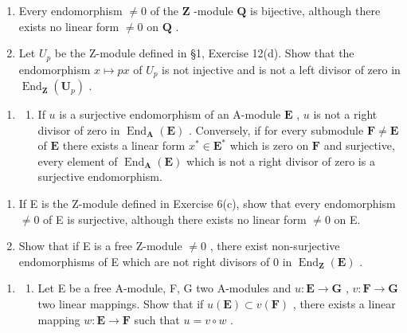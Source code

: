 \begin{enumerate}
\def\labelenumi{(\alph{enumi})}
\setcounter{enumi}{1}
\item
  Every endomorphism \(\neq 0\) of the \(\mathbf{Z}\) -module \(\mathbf{Q}\) is bijective, although there exists no linear form \(\neq 0\) on \(\mathbf{Q}\) .
\item
  Let \(U_{p}\) be the Z-module defined in §1, Exercise 12(d). Show that the endomorphism \(x \mapsto px\) of \(U_{p}\) is not injective and is not a left divisor of zero in \(\operatorname{End}_{\mathbf{Z}}(\mathbf{U}_{p})\) .
\end{enumerate}

\begin{enumerate}
\def\labelenumi{\arabic{enumi}.}
\setcounter{enumi}{6}
\tightlist
\item
  \begin{enumerate}
  \def\labelenumii{(\alph{enumii})}
  \tightlist
  \item
    If \(u\) is a surjective endomorphism of an A-module \(\mathbf{E}\) , \(u\) is not a right divisor of zero in \(\operatorname{End}_{\mathbf{A}}(\mathbf{E})\) . Conversely, if for every submodule \(\mathbf{F} \neq \mathbf{E}\) of \(\mathbf{E}\) there exists a linear form \(x^{*} \in \mathbf{E}^{*}\) which is zero on \(\mathbf{F}\) and surjective, every element of \(\operatorname{End}_{\mathbf{A}}(\mathbf{E})\) which is not a right divisor of zero is a surjective endomorphism.
  \end{enumerate}
\end{enumerate}

\begin{enumerate}
\def\labelenumi{(\alph{enumi})}
\setcounter{enumi}{1}
\item
  If E is the Z-module defined in Exercise 6(c), show that every endomorphism \(\neq 0\) of E is surjective, although there exists no linear form \(\neq 0\) on E.
\item
  Show that if E is a free Z-module \(\neq0\) , there exist non-surjective endomorphisms of E which are not right divisors of 0 in \(\operatorname{End}_{\mathbf{Z}}(\mathbf{E})\) .
\end{enumerate}

\begin{enumerate}
\def\labelenumi{\arabic{enumi}.}
\setcounter{enumi}{7}
\tightlist
\item
  \begin{enumerate}
  \def\labelenumii{(\alph{enumii})}
  \tightlist
  \item
    Let E be a free A-module, F, G two A-modules and \(u: \mathbf{E} \to \mathbf{G}\) , \(v: \mathbf{F} \to \mathbf{G}\) two linear mappings. Show that if \(u(\mathbf{E}) \subset v(\mathbf{F})\) , there exists a linear mapping \(w: \mathbf{E} \to \mathbf{F}\) such that \(u = v \circ w\) .
  \end{enumerate}
\end{enumerate}

